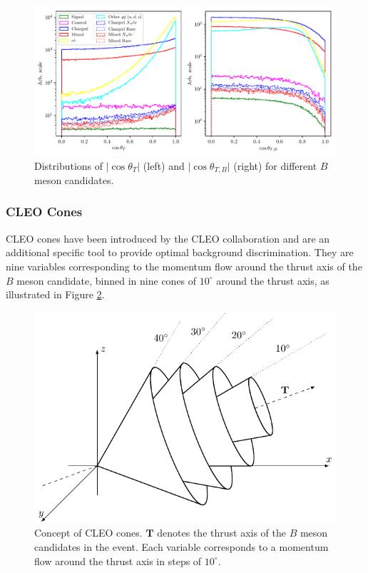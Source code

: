 \begin{figure}[H]
	\centering
	\captionsetup{width=0.8\linewidth}
	\includegraphics[width=\linewidth]{fig/cs_cosplots}
	\caption{Distributions of $\vert \cos\theta_T\vert$ (left) and $\vert \cos\theta_{T,B}\vert$ (right) for different $B$ meson candidates.}
	\label{fig:cosplots}
\end{figure}

\subsubsection{CLEO Cones}
CLEO cones have been introduced by the CLEO collaboration \cite{asner1996search} and are an additional specific tool to provide optimal background discrimination. They are nine variables corresponding to the momentum flow around the thrust axis of the $B$ meson candidate, binned in nine cones of $10^\circ$ around the thrust axis, as illustrated in Figure \ref{fig:ccones}. 

\begin{figure}[H]
	\centering
	\captionsetup{width=0.8\linewidth}
	\includegraphics[scale=1]{texfig/CCones}
	\caption{Concept of CLEO cones. $\mathbf{T}$ denotes the thrust axis of the $B$ meson candidates in the event. Each variable corresponds to a momentum flow around the thrust axis in steps of $10^\circ$.}
	\label{fig:ccones}
\end{figure}

